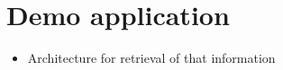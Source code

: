 \chapter{Demo application}
\label{chap:demo}

\begin{itemize}
\item Architecture for retrieval of that information
\end{itemize}
